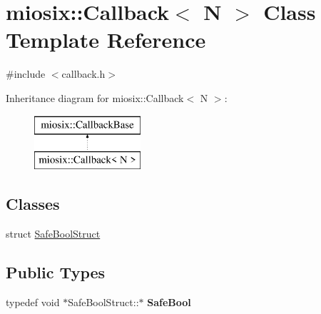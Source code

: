 \hypertarget{classmiosix_1_1_callback}{\section{miosix\-:\-:Callback$<$ N $>$ Class Template Reference}
\label{classmiosix_1_1_callback}
}


{\ttfamily \#include $<$callback.\-h$>$}

Inheritance diagram for miosix\-:\-:Callback$<$ N $>$\-:\begin{figure}[H]
\begin{center}
\leavevmode
\includegraphics[height=2.000000cm]{classmiosix_1_1_callback}
\end{center}
\end{figure}
\subsection*{Classes}
\begin{DoxyCompactItemize}
\item 
struct \hyperlink{structmiosix_1_1_callback_1_1_safe_bool_struct}{Safe\-Bool\-Struct}
\end{DoxyCompactItemize}
\subsection*{Public Types}
\begin{DoxyCompactItemize}
\item 
\hypertarget{classmiosix_1_1_callback_ab20a0bd9b897d240daac47f59664884c}{typedef void $\ast$Safe\-Bool\-Struct\-::$\ast$ {\bfseries Safe\-Bool}}\label{classmiosix_1_1_callback_ab20a0bd9b897d240daac47f59664884c}

\end{DoxyCompactItemize}
